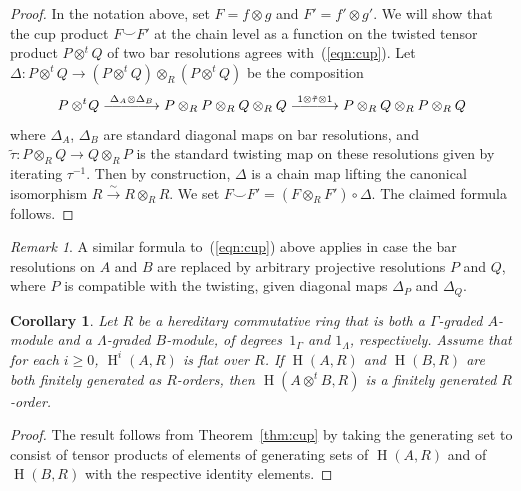 \documentclass[11pt]{amsart}
\numberwithin{equation}{section}
\newtheorem{cor}[equation]{Corollary}
\theoremstyle{definition}
\theoremstyle{remark}
\newtheorem{remark}[equation]{Remark}
\newcommand\Homol{\operatorname{H}}
\newcommand\coh{\Homol}
\newcommand\ot{\otimes}
\newcommand\ott{\otimes^{t}\!}
\newcommand{\ttpt}{A\ott B}
\begin{document}
\begin{proof}
In the notation above, set $F = f\ot g$ and $F'=f'\ot g'$. 
We will show that the cup product $F\smile F'$
at the chain level as a function on the twisted tensor product
$P\ott Q$ of two bar resolutions agrees with~(\ref{eqn:cup}).
Let $\Delta: P\ot^t\! Q\rightarrow  (P\ott Q)\ot_R (P\ot^t\! Q)$
be the composition
\[
   P\ot^t\! Q \stackrel{\Delta_A\ot \Delta_B}
     {\relbar\joinrel\relbar\joinrel\relbar\joinrel\relbar\joinrel\longrightarrow} 
   P\ot_R P \ot_R Q\ot_R Q \stackrel{1\ot\tilde{\tau}\ot 1}
  {\relbar\joinrel\relbar\joinrel\relbar\joinrel\longrightarrow}
   P\ot_R Q \ot_R P\ot_R Q
\]
where $\Delta_A$, $\Delta_B$ are standard diagonal maps on
bar resolutions, and $\tilde{\tau}: P\ot_R Q\rightarrow Q\ot_R P$ is the
standard twisting map on these resolutions given by iterating $\tau^{-1}$.
Then by construction, $\Delta$ is a chain map lifting the canonical isomorphism 
$R\stackrel{\sim}{\longrightarrow} R\ot_R R$.
We set $F\smile F' =  (F\ot_R F')\circ \Delta$.
The claimed formula follows.
\end{proof}


\begin{remark}
A similar formula to~(\ref{eqn:cup}) above applies in case the bar resolutions
on $A$ and $B$ are replaced by arbitrary projective resolutions $P$ and $Q$,
where $P$ is compatible with the twisting, given diagonal maps $\Delta_P$
and $\Delta_Q$. 
\end{remark}


\begin{cor}\label{cor:fg}
Let $R$ be a hereditary commutative ring
that is both a $\Gamma$-graded $A$-module and a $\Lambda$-graded $B$-module,
of degrees~$1_{\Gamma}$ and $1_{\Lambda}$, respectively.
Assume that for each $i\geq 0$,
  $\coh^i(A,R)$ is flat over $R$. 
If $\coh(A,R)$ and $\coh(B,R)$ are both finitely generated as $R$-orders,
then $\coh(\ttpt, R)$ is a finitely generated $R$-order.
\end{cor}


\begin{proof}
The result follows from Theorem~\ref{thm:cup} by
taking the generating set to consist of tensor products of elements
of generating sets of $\coh(A,R)$ and of $\coh(B,R)$
with the respective identity elements. 
\end{proof}
\end{document}
